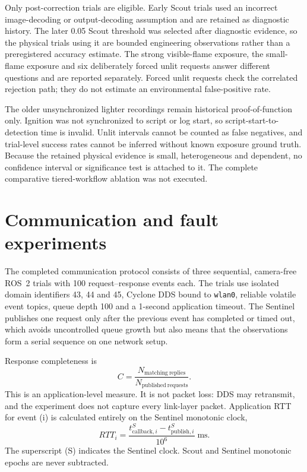 Only post-correction trials are eligible. Early Scout trials used an incorrect
image-decoding or output-decoding assumption and are retained as diagnostic
history. The later 0.05 Scout threshold was selected after diagnostic evidence,
so the physical trials using it are bounded engineering observations rather
than a preregistered accuracy estimate. The strong visible-flame exposure, the
small-flame exposure and six deliberately forced unlit requests answer
different questions and are reported separately. Forced unlit requests check
the correlated rejection path; they do not estimate an environmental
false-positive rate.

The older unsynchronized lighter recordings remain historical
proof-of-function only. Ignition was not synchronized to script or log start,
so script-start-to-detection time is invalid. Unlit intervals cannot be counted
as false negatives, and trial-level success rates cannot be inferred without
known exposure ground truth. Because the retained physical evidence is small,
heterogeneous and dependent, no confidence interval or significance test is
attached to it. The complete comparative tiered-workflow ablation was not executed.

\section{Communication and fault experiments}
\label{sec:methodology:6}

The completed communication protocol consists of three sequential,
camera-free ROS~2 trials with 100 request--response events each. The trials use
isolated domain identifiers 43, 44 and 45, Cyclone DDS bound to
\texttt{wlan0}, reliable volatile event topics, queue depth 100 and a 1-second
application timeout. The Sentinel publishes one request only after the previous
event has completed or timed out, which avoids uncontrolled queue growth but
also means that the observations form a serial sequence on one network setup.

Response completeness is
\begin{equation}
  C=\frac{N_{\mathrm{matching\ replies}}}{N_{\mathrm{published\ requests}}}.
  \label{eq:method-completeness}
\end{equation}
This is an application-level measure. It is not packet loss: DDS may retransmit,
and the experiment does not capture every link-layer packet. Application RTT
for event (i) is calculated entirely on the Sentinel monotonic clock,
\begin{equation}
  RTT_i=\frac{t^{S}_{\mathrm{callback},i}-
                    t^{S}_{\mathrm{publish},i}}{10^6}\;\mathrm{ms}.
  \label{eq:method-rtt}
\end{equation}
The superscript (S) indicates the Sentinel clock. Scout and Sentinel
monotonic epochs are never subtracted.

